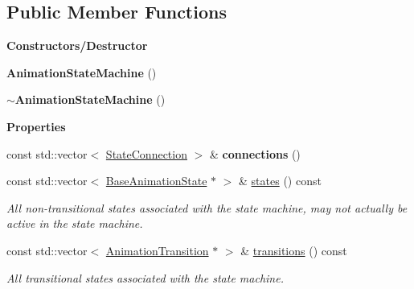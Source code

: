 \subsection*{Public Member Functions}
\begin{Indent}\textbf{ Constructors/\+Destructor}\par
\begin{DoxyCompactItemize}
\item 
\mbox{\label{classrev_1_1_animation_state_machine_aebdb54577652ec27906f403bcd67df54}} 
{\bfseries Animation\+State\+Machine} ()
\item 
\mbox{\label{classrev_1_1_animation_state_machine_aa4291384bde9a84c8b43e9bc130a591a}} 
{\bfseries $\sim$\+Animation\+State\+Machine} ()
\end{DoxyCompactItemize}
\end{Indent}
\begin{Indent}\textbf{ Properties}\par
\begin{DoxyCompactItemize}
\item 
\mbox{\label{classrev_1_1_animation_state_machine_a5948c6083e387ece6b9f7f6e099e4fb6}} 
const std\+::vector$<$ \mbox{\hyperlink{classrev_1_1_state_connection}{State\+Connection}} $>$ \& {\bfseries connections} ()
\item 
\mbox{\label{classrev_1_1_animation_state_machine_a1235889900b30131d5b7ce7ecf11b14a}} 
const std\+::vector$<$ \mbox{\hyperlink{classrev_1_1_base_animation_state}{Base\+Animation\+State}} $\ast$ $>$ \& \mbox{\hyperlink{classrev_1_1_animation_state_machine_a1235889900b30131d5b7ce7ecf11b14a}{states}} () const
\begin{DoxyCompactList}\small\item\em All non-\/transitional states associated with the state machine, may not actually be active in the state machine. \end{DoxyCompactList}\item 
\mbox{\label{classrev_1_1_animation_state_machine_a299fae109e7ae7530836f980104b8495}} 
const std\+::vector$<$ \mbox{\hyperlink{classrev_1_1_animation_transition}{Animation\+Transition}} $\ast$ $>$ \& \mbox{\hyperlink{classrev_1_1_animation_state_machine_a299fae109e7ae7530836f980104b8495}{transitions}} () const
\begin{DoxyCompactList}\small\item\em All transitional states associated with the state machine. \end{DoxyCompactList}\end{DoxyCompactItemize}
\end{Indent}

